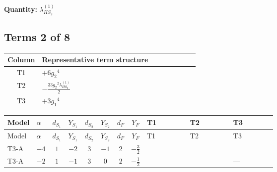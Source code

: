 \documentclass[8pt]{article}
\begin{document}
\begin{landscape}
\begin{longtable}{@{}llcccccc >{\raggedright\arraybackslash}p{0.21\linewidth} >{\raggedright\arraybackslash}p{0.21\linewidth} >{\raggedright\arraybackslash}p{0.21\linewidth}@{}}
\midrule
\bottomrule
\end{longtable}
\clearpage
\noindent\textbf{Quantity: }$\lambda_{HS_2}^{(1)}$\par\smallskip
\subsection*{Terms 2 of 8}
\begin{center}
\begin{tabular}{@{}c >{\raggedright\arraybackslash}p{0.82\linewidth}@{}}
\toprule
Column & Representative term structure \\
\midrule
T1 & \(\displaystyle +6 {g_2}^4\) \\
\midrule
T2 & \(\displaystyle -\frac{33 {g_2}^2 {\lambda_{HS_2}^{(1)}}}{2}\) \\
\midrule
T3 & \(\displaystyle +3 {g_1}^4\) \\
\midrule
\bottomrule
\end{tabular}
\end{center}
\smallskip
\tiny
\begin{longtable}{@{}llcccccc >{\raggedright\arraybackslash}p{0.21\linewidth} >{\raggedright\arraybackslash}p{0.21\linewidth} >{\raggedright\arraybackslash}p{0.21\linewidth}@{}}
\toprule
Model & $\alpha$ & $d_{S_1}$ & $Y_{S_1}$ & $d_{S_2}$ & $Y_{S_2}$ & $d_F$ & $Y_F$ & T1 & T2 & T3 \\
\midrule
\endfirsthead
\toprule
Model & $\alpha$ & $d_{S_1}$ & $Y_{S_1}$ & $d_{S_2}$ & $Y_{S_2}$ & $d_F$ & $Y_F$ & T1 & T2 & T3 \\
\midrule
\endhead
T3-A & $-4$ & $1$ & $-2$ & $3$ & $-1$ & $2$ & $-\frac{3}{2}$ & \scriptsize\adjustbox{max width=\linewidth}{$\begin{gathered} +6 {g_2}^4\end{gathered}$} & \scriptsize\adjustbox{max width=\linewidth}{$\begin{gathered} -\frac{33 {g_2}^2 {\lambda_{HS_2}^{(1)}}}{2}\end{gathered}$} & \scriptsize\adjustbox{max width=\linewidth}{$\begin{gathered} +3 {g_1}^4\end{gathered}$} \\
\midrule
T3-A & $-2$ & $1$ & $-1$ & $3$ & $0$ & $2$ & $-\frac{1}{2}$ & \scriptsize\adjustbox{max width=\linewidth}{$\begin{gathered} +6 {g_2}^4\end{gathered}$} & \scriptsize\adjustbox{max width=\linewidth}{$\begin{gathered} -\frac{33 {g_2}^2 {\lambda_{HS_2}^{(1)}}}{2}\end{gathered}$} & --- \\

\end{longtable}
\end{landscape}
\end{document}
